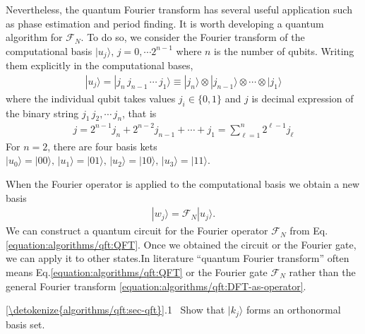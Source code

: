 \documentclass[letterpaper,10pt,english]{jupyterBook}
\begin{document}
\sphinxAtStartPar
Nevertheless, the quantum Fourier transform has several useful application such as phase estimation and period finding. It is worth developing a quantum algorithm for \(\mathcal{F}_N\).  To do so, we consider the Fourier transform of the computational basis \(|u_j\rangle ,\,  j=0,\cdots 2^{n-1}\) where \(n\) is the number of qubits.  Writing them  explicitly in the computational bases,
\begin{equation*}
\begin{split}
|u_j\rangle=|j_n\, j_{n-1}\, \cdots\, j_1\rangle \equiv  |j_n\rangle \otimes |j_{n-1}\rangle \otimes \cdots \otimes |j_1\rangle
\end{split}
\end{equation*}
\sphinxAtStartPar
where the individual qubit takes values \(j_i \in \{0,1\}\) and \(j\) is decimal expression of the binary string \(j_1\, j_2,\cdots\, j_n\), that is
\begin{equation}\label{equation:algorithms/qft:decimal-binary}
\begin{split}
j=2^{n-1} j_{n} + 2^{n-2} j_{n-1} +\cdots+ j_1 = \sum_{\ell=1}^{n} 2^{\ell-1} j_\ell
\end{split}
\end{equation}
\sphinxAtStartPar
For \(n=2\), there are four basis kets \(|u_0\rangle=|00\rangle,\, |u_1\rangle=|01\rangle,\,  |u_2\rangle=|10\rangle,\, |u_3\rangle=|11\rangle\).

\sphinxAtStartPar
When the Fourier operator is applied to the computational basis we obtain a new basis
\begin{equation}\label{equation:algorithms/qft:QFT}
\begin{split}
|w_j\rangle = \mathcal{F}_N |u_j\rangle .
\end{split}
\end{equation}
\sphinxAtStartPar
We can construct a quantum circuit for the Fourier operator \(\mathcal{F}_N\) from Eq.  \eqref{equation:algorithms/qft:QFT}.  Once we obtained the circuit or the Fourier gate, we can apply it to other states.In literature  “quantum Fourier transform” often means  Eq.\eqref{equation:algorithms/qft:QFT} or the Fourier gate \(\mathcal{F}_N\) rather than the general Fourier transform \eqref{equation:algorithms/qft:DFT-as-operator}.

\sphinxAtStartPar
{} \hyperref[\detokenize{algorithms/qft:sec-qft}]{\ref{\detokenize{algorithms/qft:sec-qft}}}.1   Show that \(|k_j\rangle\) forms an orthonormal basis set.
\end{document}
